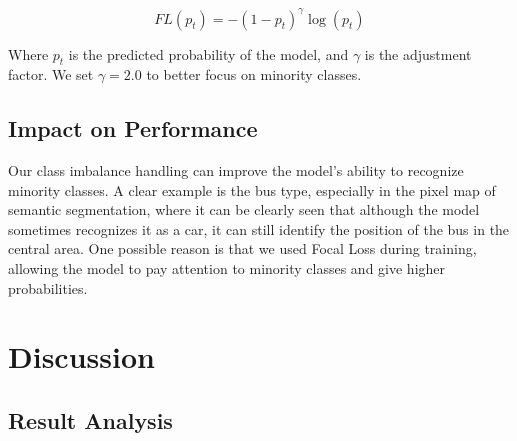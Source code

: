 \documentclass[conference]{IEEEtran}
\begin{document}
\[FL(p_t) = -(1 - p_t)^\gamma \log(p_t)\]


Where \(p_t\) is the predicted probability of the model, and \(\gamma\) is the adjustment factor. We set \(\gamma=2.0\) to better focus on minority classes.


\subsection{Impact on Performance}


Our class imbalance handling can improve the model's ability to recognize minority classes. A clear example is the bus type, especially in the pixel map of semantic segmentation, where it can be clearly seen that although the model sometimes recognizes it as a car, it can still identify the position of the bus in the central area. One possible reason is that we used Focal Loss during training, allowing the model to pay attention to minority classes and give higher probabilities.



\section{Discussion}
\subsection{Result Analysis}


\end{document}
